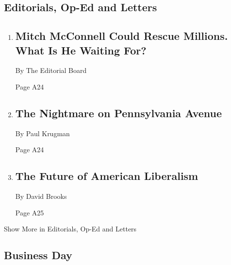 \hypertarget{editorials-op-ed-and-letters}{%
\subsection{Editorials, Op-Ed and
Letters}\label{editorials-op-ed-and-letters}}

\begin{enumerate}
\def\labelenumi{\arabic{enumi}.}
\item
  \href{/2020/07/30/opinion/mitch-mcconnell-coronavirus-economy.html}{}

  \hypertarget{mitch-mcconnell-could-rescue-millions-what-is-he-waiting-for}{%
  \subsection{Mitch McConnell Could Rescue Millions. What Is He Waiting
  For?}\label{mitch-mcconnell-could-rescue-millions-what-is-he-waiting-for}}

  By The Editorial Board

  Page A24
\item
  \href{/2020/07/30/opinion/trump-coronavirus-economy.html}{}

  \hypertarget{the-nightmare-on-pennsylvania-avenue}{%
  \subsection{The Nightmare on Pennsylvania
  Avenue}\label{the-nightmare-on-pennsylvania-avenue}}

  By Paul Krugman

  Page A24
\item
  \href{/2020/07/30/opinion/biden-fdr.html}{}

  \hypertarget{the-future-of-american-liberalism}{%
  \subsection{The Future of American
  Liberalism}\label{the-future-of-american-liberalism}}

  By David Brooks

  Page A25
\end{enumerate}

Show More in Editorials, Op-Ed and Letters

\hypertarget{business-day}{%
\subsection{Business Day}\label{business-day}}

